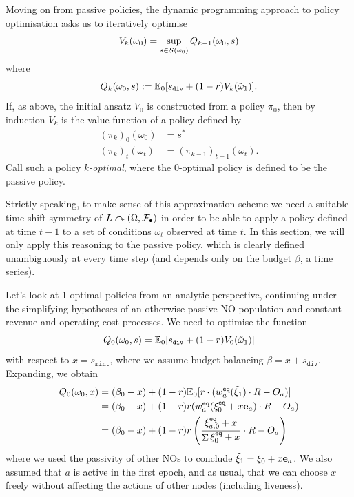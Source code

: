 Moving on from passive policies, the dynamic programming approach to policy optimisation asks us to iteratively optimise
\[
  V_k(\omega_0) = \sup_{s\in\mathcal{S}(\omega_0)} Q_{k-1}(\omega_0,s)
\]
%
where
%
\[
  Q_k(\omega_0,s) := \mathbb{E}_0[s_\mathtt{div} + (1-r) V_k(\tilde{\omega}_1) ].
\]
%
If, as above, the initial ansatz $V_0$ is constructed from a policy $\pi_0$, then by induction $V_k$ is the value function of a policy defined by
%
\begin{align*}
  (\pi_k)_0(\omega_0) &= s^* \\
  (\pi_k)_t(\omega_t) &= (\pi_{k-1})_{t-1}(\omega_t).
\end{align*}
%
Call such a policy \emph{$k$-optimal}, where the $0$-optimal policy is defined to be the passive policy.

\begin{remark}

  Strictly speaking, to make sense of this approximation scheme we need a suitable time shift symmetry of $L\curvearrowright(\Omega,\mathcal{F}_\bullet)$ in order to be able to apply a policy defined at time $t-1$ to a set of conditions $\omega_t$ observed at time $t$.
  In this section, we will only apply this reasoning to the passive policy, which is clearly defined unambiguously at every time step (and depends only on the budget $\beta$, a time series).

\end{remark}

Let's look at 1-optimal policies from an analytic perspective, continuing under the simplifying hypotheses of an otherwise passive NO population and constant revenue and operating cost processes.
%
We need to optimise the function
%
\[
  Q_0(\omega_0,s) = \mathbb{E}_0[s_\mathtt{div} + (1-r) V_0(\tilde{\omega}_1) ] \\
\]
%
with respect to $x=s_\mathtt{mint}$, where we assume budget balancing $\beta=x+s_\mathtt{div}$.
%
Expanding, we obtain
%
\begin{align*}
  Q_0(\omega_0,x) &= (\beta_0 - x) + (1-r) \mathbb{E}_0[r\cdot (w_a^{\mathtt{eq}}(\tilde{\xi}_1)\cdot R - O_a)] \\
  &= (\beta_0 - x) + (1-r)r(w_a^{\mathtt{eq}}(\xi_0^{\mathtt{eq}} + x\mathbf{e}_a)\cdot R - O_a) \\
  &= (\beta_0 - x) + (1-r)r \left( \frac{\xi_{a,0}^{\mathtt{eq}} + x} {\mathop{\Sigma}\xi_0^{\mathtt{eq}} + x} \cdot R - O_a \right)
\end{align*}
%
where we used the passivity of other NOs to conclude $\tilde{\xi}_1= \xi_0 + x\mathbf{e}_a $.
%
We also assumed that $a$ is active in the first epoch, and as usual, that we can choose $x$ freely without affecting the actions of other nodes (including liveness).

